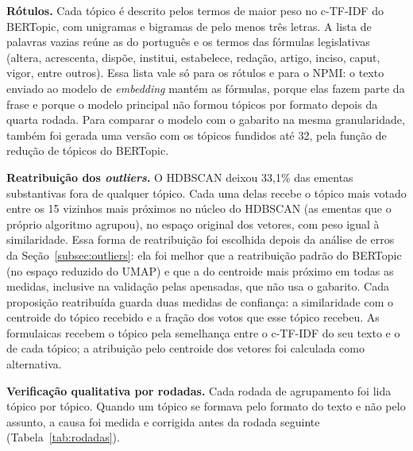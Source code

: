 \textbf{Rótulos.} Cada tópico é descrito pelos termos de maior peso no c-TF-IDF do BERTopic, com unigramas e bigramas de pelo menos três letras. A lista de palavras vazias reúne as do português e os termos das fórmulas legislativas (altera, acrescenta, dispõe, institui, estabelece, redação, artigo, inciso, caput, vigor, entre outros). Essa lista vale só para os rótulos e para o NPMI: o texto enviado ao modelo de \textit{embedding} mantém as fórmulas, porque elas fazem parte da frase e porque o modelo principal não formou tópicos por formato depois da quarta rodada. Para comparar o modelo com o gabarito na mesma granularidade, também foi gerada uma versão com os tópicos fundidos até 32, pela função de redução de tópicos do BERTopic.

\textbf{Reatribuição dos \textit{outliers}.} O HDBSCAN deixou 33,1\% das ementas substantivas fora de qualquer tópico. Cada uma delas recebe o tópico mais votado entre os 15 vizinhos mais próximos no núcleo do HDBSCAN (as ementas que o próprio algoritmo agrupou), no espaço original dos vetores, com peso igual à similaridade. Essa forma de reatribuição foi escolhida depois da análise de erros da Seção~\ref{subsec:outliers}: ela foi melhor que a reatribuição padrão do BERTopic (no espaço reduzido do UMAP) e que a do centroide mais próximo em todas as medidas, inclusive na validação pelas apensadas, que não usa o gabarito. Cada proposição reatribuída guarda duas medidas de confiança: a similaridade com o centroide do tópico recebido e a fração dos votos que esse tópico recebeu. As formulaicas recebem o tópico pela semelhança entre o c-TF-IDF do seu texto e o de cada tópico; a atribuição pelo centroide dos vetores foi calculada como alternativa.

\textbf{Verificação qualitativa por rodadas.} Cada rodada de agrupamento foi lida tópico por tópico. Quando um tópico se formava pelo formato do texto e não pelo assunto, a causa foi medida e corrigida antes da rodada seguinte (Tabela~\ref{tab:rodadas}).


